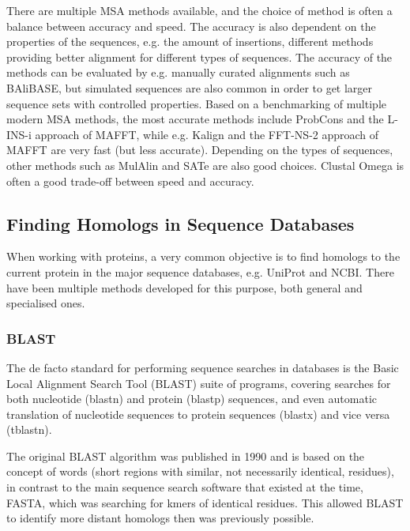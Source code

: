 \documentclass[a4paper, twoside, 12pt, openright]{report}
\begin{document}
There are multiple MSA methods available, and the choice of method is often a balance between accuracy and speed. The accuracy is also dependent on the properties of the sequences, e.g. the amount of insertions, different methods providing better alignment for different types of sequences. The accuracy of the methods can be evaluated by e.g. manually curated alignments such as BAliBASE\cite{thompson_balibase_2005}, but simulated sequences are also common in order to get larger sequence sets with controlled properties. Based on a benchmarking of multiple modern MSA methods\cite{pervez_evaluating_2014}, the most accurate methods include ProbCons\cite{do_probcons:_2005} and the L-INS-i approach of MAFFT\cite{katoh_mafft:_2002,katoh_mafft_2013}, while e.g. Kalign\cite{lassmann_kalign--accurate_2005,lassmann_kalign2:_2009} and the FFT-NS-2 approach of MAFFT are very fast (but less accurate). Depending on the types of sequences, other methods such as MulAlin\cite{corpet_multiple_1988} and SATe\cite{liu_rapid_2009,liu_sate-ii:_2012} are also good choices. Clustal Omega\cite{sievers_fast_2011} is often a good trade-off between speed and accuracy.


\subsection{Finding Homologs in Sequence Databases}
\label{sec:method_find_homologs}

When working with proteins, a very common objective is to find homologs to the current protein in the major sequence databases, e.g. UniProt and NCBI. There have been multiple methods developed for this purpose, both general and specialised ones. 


\subsubsection{BLAST}
\label{sec:method_blast}

The de facto standard for performing sequence searches in databases is the Basic Local Alignment Search Tool (BLAST)  \cite{altschul_gapped_1997, camacho_blast+:_2009} suite of programs, covering searches for both nucleotide (blastn) and protein (blastp) sequences, and even automatic translation of nucleotide sequences to protein sequences (blastx) and vice versa (tblastn).

The original BLAST algorithm was published in 1990\cite{altschul_basic_1990} and is based on the concept of words (short regions with similar, not necessarily identical, residues), in contrast to the main sequence search software that existed at the time, FASTA\cite{lipman_rapid_1985}, which was searching for kmers of identical residues. This allowed BLAST to identify more distant homologs then was previously possible.
\end{document}
